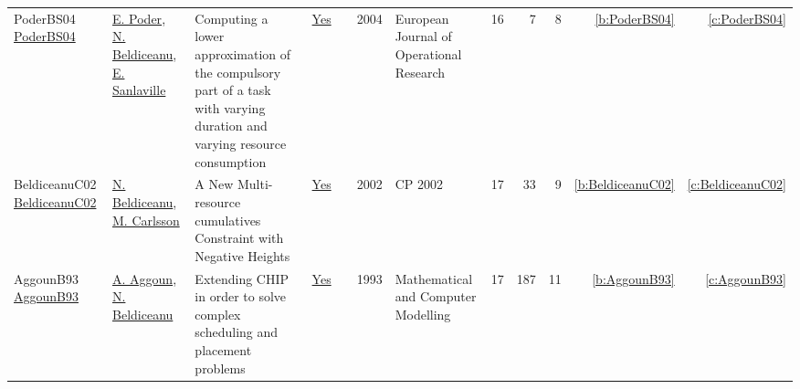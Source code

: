 {\begin{longtable}{>{\raggedright\arraybackslash}p{3cm}>{\raggedright\arraybackslash}p{6cm}>{\raggedright\arraybackslash}p{6.5cm}rrrp{2.5cm}rrrrr}
PoderBS04 \href{https://doi.org/10.1016/S0377-2217(02)00756-7}{PoderBS04} & \hyperref[auth:a364]{E. Poder}, \hyperref[auth:a129]{N. Beldiceanu}, \hyperref[auth:a722]{E. Sanlaville} & Computing a lower approximation of the compulsory part of a task with varying duration and varying resource consumption & \href{../works/PoderBS04.pdf}{Yes} & \cite{PoderBS04} & 2004 & European Journal of Operational Research & 16 & 7 & 8 & \ref{b:PoderBS04} & \ref{c:PoderBS04}\\
BeldiceanuC02 \href{https://doi.org/10.1007/3-540-46135-3\_5}{BeldiceanuC02} & \hyperref[auth:a129]{N. Beldiceanu}, \hyperref[auth:a91]{M. Carlsson} & A New Multi-resource cumulatives Constraint with Negative Heights & \href{../works/BeldiceanuC02.pdf}{Yes} & \cite{BeldiceanuC02} & 2002 & CP 2002 & 17 & 33 & 9 & \ref{b:BeldiceanuC02} & \ref{c:BeldiceanuC02}\\
AggounB93 \href{https://www.sciencedirect.com/science/article/pii/089571779390068A}{AggounB93} & \hyperref[auth:a734]{A. Aggoun}, \hyperref[auth:a129]{N. Beldiceanu} & Extending {CHIP} in order to solve complex scheduling and placement problems & \href{../works/AggounB93.pdf}{Yes} & \cite{AggounB93} & 1993 & Mathematical and Computer Modelling & 17 & 187 & 11 & \ref{b:AggounB93} & \ref{c:AggounB93}\\
\end{longtable}
}

\clearpage
